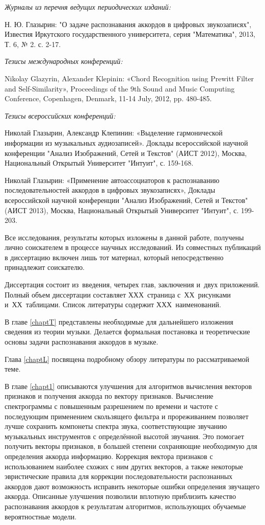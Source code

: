 \textit{Журналы из перечня ведущих периодических изданий:}

Н. Ю. Глазырин: "О задаче распознавания аккордов в цифровых звукозаписях",
Известия Иркутского государственного университета, серия "Математика", 2013, Т.
6, № 2. с. 2-17.

\textit{Тезисы международных конференций:}

Nikolay Glazyrin, Alexander Klepinin: «Chord Recognition using Prewitt Filter
and Self-Similarity», Proceedings of the 9th Sound and Music Computing
Conference, Copenhagen, Denmark, 11-14 July, 2012, pp. 480-485.

\textit{Тезисы всероссийских конференций:}

Николай Глазырин, Александр Клепинин: «Выделение гармонической информации из
музыкальных аудиозаписей». Доклады всероссийской научной конференции "Анализ
Изображений, Сетей и Текстов" (АИСТ 2012), Москва, Национальный Открытый
Университет "Интуит", с. 159-168.

Николай Глазырин: «Применение автоассоциаторов к распознаванию
последовательностей аккордов в цифровых звукозаписях», Доклады всероссийской
научной конференции "Анализ Изображений, Сетей и Текстов" (АИСТ 2013), Москва,
Национальный Открытый Университет "Интуит", с. 199-203.

Все исследования, результаты которых изложены в данной работе, получены лично
соискателем в процессе научных исследований. Из совместных публикаций в
диссертацию включен лишь тот материал, который непосредственно принадлежит
соискателю.

\medskip

Диссертация состоит из~введения, четырех глав, заключения и~двух приложений.
Полный объем диссертации составляет ХХХ~страница с~ХХ~рисунками и~ХХ~таблицами.
Список литературы содержит ХХХ~наименований.

В главе \ref{chaptT} представлены необходимые для дальнейшего изложения сведения
из теории музыки. Делается формальная постановка и теоретические основы задачи
распознавания аккордов в музыке.

Глава \ref{chaptL} посвящена подробному обзору литературы по рассматриваемой
теме. 

В главе \ref{chapt1} описываются улучшения для алгоритмов вычисления векторов
признаков и получения аккорда по вектору признаков. Вычисление спектрограммы с
повышенным разрешением по времени и частоте с последующим применением
скользящего фильтра и прореживанием позволяет лучше сохранить компонеты спектра
звука, соответствующие звучанию музыкальных инструментов с определённой высотой
звучания. Это помогает получить векторы признаков, в большей степени сохраняющие
необходимую для определения аккорда информацию. Коррекция вектора признаков с
использованием наиболее схожих с ним других векторов, а также некоторые
эвристические правила для коррекции последовательности распознанных аккордов
дают возможность исправить некоторые ошибки определения звучащего аккорда.
Описанные улучшения позволили вплотную приблизить качество распознавания
аккордов к результатам алгоритмов, использующих обучаемые вероятностные модели.

